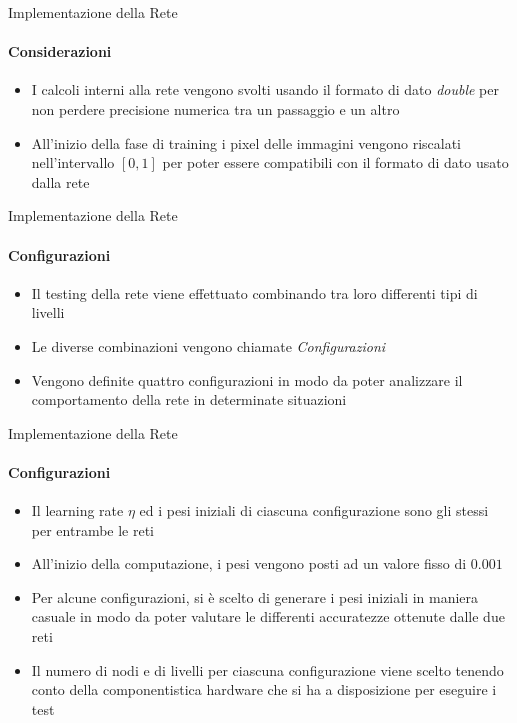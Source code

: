 \documentclass[
 ]{beamer}
\begin{document}
\begin{frame}{Implementazione della Rete}
    \framesubtitle{Considerazioni}
    \begin{itemize} [<+->]
        \setlength\itemsep{1.5em}
        \item \large I calcoli interni alla rete vengono svolti usando il formato di dato \emph{double} per non perdere precisione numerica tra un passaggio e un altro
        \item \large All'inizio della fase di training i pixel delle immagini vengono riscalati nell'intervallo $[0,1]$ per poter essere compatibili con il formato di dato usato dalla rete 
    \end{itemize} 
    
\end{frame}

\begin{frame}{Implementazione della Rete}
    \framesubtitle{Configurazioni}
    \smallskip
    \begin{itemize} [<+->]
        \setlength\itemsep{2em}
        \item \large Il testing della rete viene effettuato combinando tra loro differenti tipi di livelli
        \item \large Le diverse combinazioni vengono chiamate \emph{Configurazioni}
        \item \large Vengono definite quattro configurazioni in modo da poter analizzare il comportamento della rete in determinate situazioni
    \end{itemize}     
\end{frame}

\begin{frame}{Implementazione della Rete}
    \framesubtitle{Configurazioni}
    \smallskip
    \begin{itemize} [<+->]
        \setlength\itemsep{2em}
        \item \large Il learning rate $\eta$ ed i pesi iniziali di ciascuna configurazione sono gli stessi per entrambe le reti 
        \item \large All'inizio della computazione, i pesi vengono posti ad un valore fisso di $0.001$ 
        \item \large Per alcune configurazioni, si è scelto di generare i pesi iniziali in maniera casuale in modo da poter valutare le differenti accuratezze ottenute dalle due reti
        \item \large Il numero di nodi e di livelli per ciascuna configurazione viene scelto tenendo conto della componentistica hardware che si ha a disposizione per eseguire i test
    \end{itemize}     
\end{frame}
\end{document}
